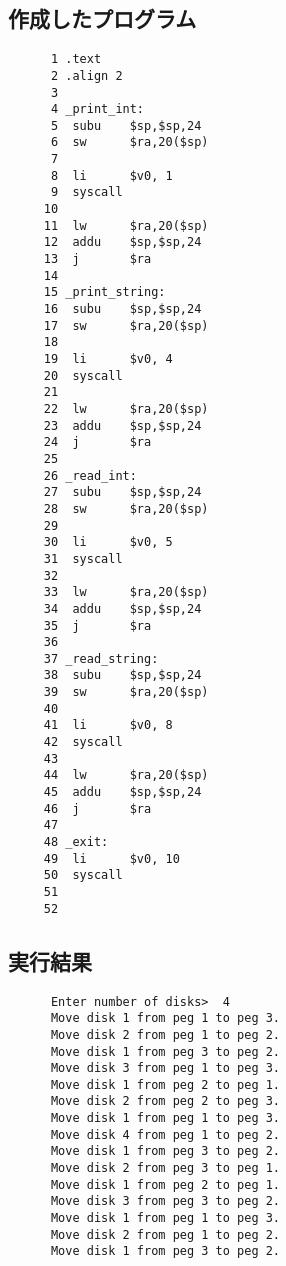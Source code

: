 \documentclass[a4j,11pt]{jarticle}
\begin{document}
\subsection{作成したプログラム}
\begin{verbatim}
      1	.text
      2	.align 2
      3	
      4	_print_int:
      5	 subu    $sp,$sp,24
      6	 sw      $ra,20($sp)
      7	
      8	 li      $v0, 1
      9	 syscall
     10	
     11	 lw      $ra,20($sp)
     12	 addu    $sp,$sp,24
     13	 j       $ra 
     14	
     15	_print_string:
     16	 subu    $sp,$sp,24
     17	 sw      $ra,20($sp)
     18	
     19	 li      $v0, 4
     20	 syscall
     21	
     22	 lw      $ra,20($sp)
     23	 addu    $sp,$sp,24
     24	 j       $ra 
     25	
     26	_read_int:
     27	 subu    $sp,$sp,24
     28	 sw      $ra,20($sp)
     29	
     30	 li      $v0, 5
     31	 syscall
     32	
     33	 lw      $ra,20($sp)
     34	 addu    $sp,$sp,24
     35	 j       $ra 
     36	
     37	_read_string:
     38	 subu    $sp,$sp,24
     39	 sw      $ra,20($sp)
     40	
     41	 li      $v0, 8
     42	 syscall
     43	
     44	 lw      $ra,20($sp)
     45	 addu    $sp,$sp,24
     46	 j       $ra
     47	
     48	_exit:
     49	 li      $v0, 10
     50	 syscall
     51	
     52	 	
\end{verbatim}

\subsection{実行結果}

\begin{verbatim}
      Enter number of disks>  4
      Move disk 1 from peg 1 to peg 3.
      Move disk 2 from peg 1 to peg 2.
      Move disk 1 from peg 3 to peg 2.
      Move disk 3 from peg 1 to peg 3.
      Move disk 1 from peg 2 to peg 1.
      Move disk 2 from peg 2 to peg 3.
      Move disk 1 from peg 1 to peg 3.
      Move disk 4 from peg 1 to peg 2.
      Move disk 1 from peg 3 to peg 2.
      Move disk 2 from peg 3 to peg 1.
      Move disk 1 from peg 2 to peg 1.
      Move disk 3 from peg 3 to peg 2.
      Move disk 1 from peg 1 to peg 3.
      Move disk 2 from peg 1 to peg 2.
      Move disk 1 from peg 3 to peg 2.           
\end{verbatim}
\end{document}
